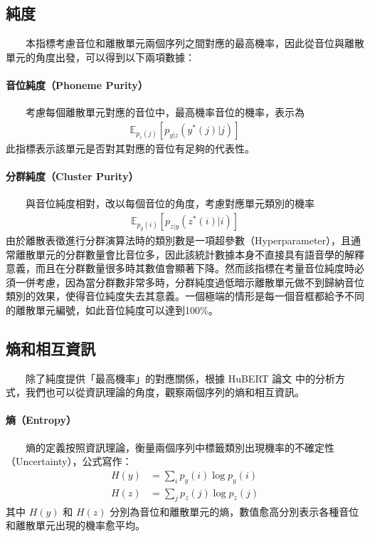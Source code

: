 {{\subsection{純度}

　　本指標考慮音位和離散單元兩個序列之間對應的最高機率，因此從音位與離散單元的角度出發，可以得到以下兩項數據：

\paragraph{音位純度（Phoneme Purity）}\hfill \break
%
　　考慮每個離散單元對應的音位中，最高機率音位的機率，表示為
\begin{align}
    \mathbb{E}_{p_z(j)}\left[p_{y|z}(y^*(j)|j) \right]
\end{align}
此指標表示該單元是否對其對應的音位有足夠的代表性。

\paragraph{分群純度（Cluster Purity）}\hfill \break
%
　　與音位純度相對，改以每個音位的角度，考慮對應單元類別的機率
\begin{align}
    \mathbb{E}_{p_y(i)}\left[p_{z|y}(z^*(i)|i) \right]
\end{align}
        由於離散表徵進行分群演算法時的類別數是一項超參數（Hyperparameter），且通常離散單元的分群數量會比音位多，因此該統計數據本身不直接具有語音學的解釋意義，而且在分群數量很多時其數值會顯著下降。然而該指標在考量音位純度時必須一併考慮，因為當分群數非常多時，分群純度過低暗示離散單元做不到歸納音位類別的效果，使得音位純度失去其意義。一個極端的情形是每一個音框都給予不同的離散單元編號，如此音位純度可以達到100\%。

\subsection{熵和相互資訊}

　　除了純度提供「最高機率」的對應關係，根據 HuBERT 論文 \cite{hsu_hubert_2021-2} 中的分析方式，我們也可以從資訊理論的角度，觀察兩個序列的熵和相互資訊。

\paragraph{熵（Entropy）} \hfill \break
%
　　熵的定義按照資訊理論，衡量兩個序列中標籤類別出現機率的不確定性（Uncertainty），公式寫作：
\begin{align}
    H(y) & = \sum_i{p_y(i)\log p_y(i)} \\
    H(z) & = \sum_j{p_z(j)\log p_z(j)}
\end{align}
其中 $H(y)$ 和 $H(z)$ 分別為音位和離散單元的熵，數值愈高分別表示各種音位和離散單元出現的機率愈平均。

}}
